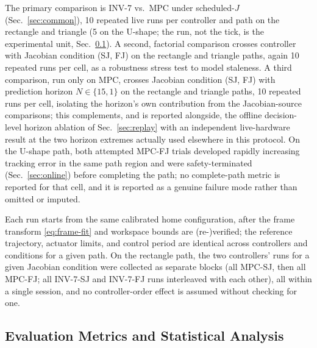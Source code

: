 \documentclass[journal]{IEEEtran}
\begin{document}
The primary comparison is INV-7 vs.\ MPC under scheduled-$J$
(Sec.~\ref{sec:common}), 10 repeated live runs per controller and path on
the rectangle and triangle (5 on the U-shape; the run, not the tick, is
the experimental unit, Sec.~\ref{sec:metrics}). A second, factorial
comparison crosses controller with Jacobian condition (SJ, FJ) on the
rectangle and triangle paths, again 10 repeated runs per cell, as a
robustness stress test to model staleness. A third comparison, run only
on MPC, crosses Jacobian condition (SJ, FJ) with prediction horizon
$N\in\{15,1\}$ on the rectangle and triangle paths, 10 repeated runs per
cell, isolating the horizon's own contribution from the Jacobian-source
comparisons; this complements, and is reported alongside, the offline
decision-level horizon ablation of Sec.~\ref{sec:replay} with an
independent live-hardware result at the two horizon extremes actually
used elsewhere in this protocol. On the U-shape path, both attempted
MPC-FJ trials developed rapidly increasing tracking error in the same
path region and were safety-terminated (Sec.~\ref{sec:online}) before
completing the path; no complete-path metric is reported for that cell,
and it is reported as a genuine failure mode rather than omitted or
imputed.

Each run starts from the same calibrated home configuration, after the
frame transform \eqref{eq:frame-fit} and workspace bounds are
(re-)verified; the reference trajectory, actuator limits, and control
period are identical across controllers and conditions for a given path.
On the rectangle path, the two controllers' runs for a given Jacobian
condition were collected as separate blocks (all MPC-SJ, then all MPC-FJ;
all INV-7-SJ and INV-7-FJ runs interleaved with each other), all within a
single session, and no controller-order effect is assumed without
checking for one. %

\subsection{Evaluation Metrics and Statistical Analysis}
\label{sec:metrics}
\end{document}
